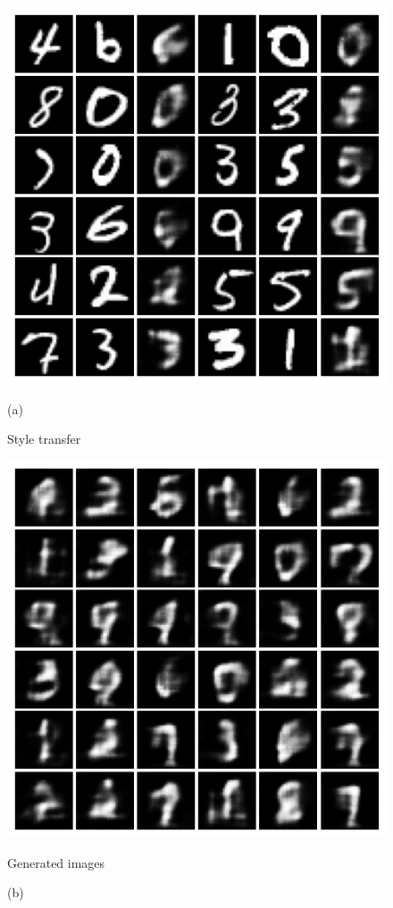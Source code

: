 \documentclass{article}
\begin{document}
\begin{figure}[hbt]
	\centering
	\begin{minipage}{.5\textwidth}
		\centering
		\includegraphics[width=.8\linewidth]{images/mnist_transfer_fuzzy.png}
		\caption{(a)}{Style transfer}
		\label{fig:sub1}
	\end{minipage}%
	\begin{minipage}{.5\textwidth}
		\centering
		\includegraphics[width=.8\linewidth]{images/mnist_generated_fuzzy.png}
		\caption{(b)}{Generated images}
		\label{fig:sub2}
	\end{minipage}
\end{figure}
\end{document}
